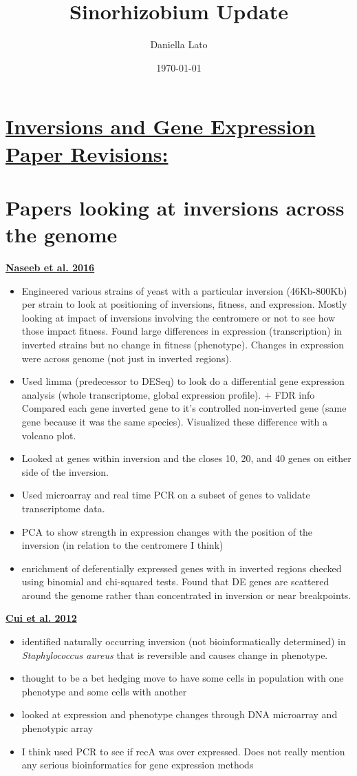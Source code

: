 \documentclass[12pt]{article}
\title{Sinorhizobium Update}
\author{Daniella Lato}
\date{\today}
\newcommand{\saur}{\textit{Staphylococcus aureus}\xspace}
\begin{document}
\section*{\underline{Inversions and Gene Expression Paper Revisions:}}

\section*{Papers looking at inversions across the genome}
\textbf{\href{https://www.ncbi.nlm.nih.gov/pmc/articles/PMC4915352/}{Naseeb et al. 2016}}
\begin{itemize}
	\item Engineered various strains of yeast with a particular inversion (46Kb-800Kb) per strain to look at positioning of inversions, fitness, and expression.
	Mostly looking at impact of inversions involving the centromere or not to see how those impact fitness.
	Found large differences in expression (transcription) in inverted strains but no change in fitness (phenotype).
	Changes in expression were across genome (not just in inverted regions).
	\item Used limma (predecessor to DESeq) to look do a differential gene expression analysis (whole transcriptome, global expression profile). $+$ FDR info
	Compared each gene inverted gene to it's controlled non-inverted gene (same gene because it was the same species).
	Visualized these difference with a volcano plot.
	\item Looked at genes within inversion and the closes 10, 20, and 40 genes on either side of the inversion.
	\item Used microarray and real time PCR on a subset of genes to validate transcriptome data.
	\item PCA to show strength in expression changes with the position of the inversion (in relation to the centromere I think)
	\item enrichment of deferentially expressed genes with in inverted regions checked using binomial and chi-squared tests. Found that DE genes are scattered around the genome rather than concentrated in inversion or near breakpoints. 
\end{itemize}

\textbf{\href{https://www.ncbi.nlm.nih.gov/pmc/articles/PMC3382547/}{Cui et al. 2012}}
\begin{itemize}
	\item identified naturally occurring inversion (not bioinformatically determined) in \saur that is reversible and causes change in phenotype.
	\item thought to be a bet hedging move to have some cells in population with one phenotype and some cells with another
	\item looked at expression and phenotype changes through DNA microarray and phenotypic array
	\item I think used PCR to see if recA was over expressed. Does not really mention any serious bioinformatics for gene expression methods
\end{itemize}
\end{document}
